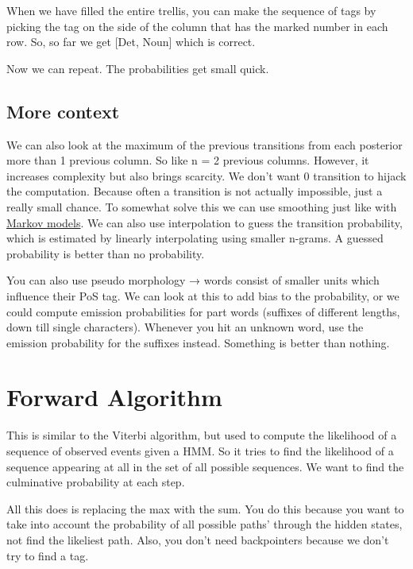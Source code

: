 \documentclass[
  11pt,
  british,
]{article}
\begin{document}
When we have filled the entire trellis, you can make the sequence of
tags by picking the tag on the side of the column that has the marked
number in each row. So, so far we get {[}Det, Noun{]} which is correct.

Now we can repeat. The probabilities get small quick.

\hypertarget{more-context}{%
\subsection{More context}\label{more-context}}

We can also look at the maximum of the previous transitions from each
posterior more than 1 previous column. So like n = 2 previous columns.
However, it increases complexity but also brings scarcity. We don't want
0 transition to hijack the computation. Because often a transition is
not actually impossible, just a really small chance. To somewhat solve
this we can use smoothing just like with
\href{Markov\%20models.md}{Markov models}. We can also use interpolation
to guess the transition probability, which is estimated by linearly
interpolating using smaller n-grams. A guessed probability is better
than no probability.

You can also use pseudo morphology → words consist of smaller units
which influence their PoS tag. We can look at this to add bias to the
probability, or we could compute emission probabilities for part words
(suffixes of different lengths, down till single characters). Whenever
you hit an unknown word, use the emission probability for the suffixes
instead. Something is better than nothing.

\hypertarget{forward-algorithm}{%
\section{Forward Algorithm}\label{forward-algorithm}}

This is similar to the Viterbi algorithm, but used to compute the
likelihood of a sequence of observed events given a HMM. So it tries to
find the likelihood of a sequence appearing at all in the set of all
possible sequences. We want to find the culminative probability at each
step.

All this does is replacing the max with the sum. You do this because you
want to take into account the probability of all possible paths' through
the hidden states, not find the likeliest path. Also, you don't need
backpointers because we don't try to find a tag.
\end{document}
